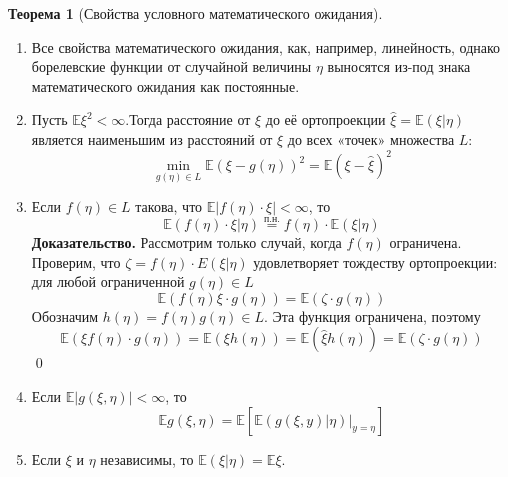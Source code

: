 \documentclass[oneside,final,14pt]{extreport}
\renewenvironment{proof}{{\bfseries Доказательство.}}{\qed}
\theoremstyle{plain}
\theoremstyle{definition}
\theoremstyle{named}
\newtheorem*{namedthm}{Теорема}
\begin{document}
\begin{namedthm}[Свойства условного математического ожидания]\leavevmode
    \begin{enumerate}
        \item Все свойства математического ожидания, как, например, линейность, однако борелевские функции от случайной величины $\eta$ выносятся из-под знака математического ожидания как постоянные.
        \item Пусть $\mathbb{E} \xi^{2}<\infty$.Тогда расстояние от $\xi$ до её ортопроекции $\widehat{\xi}=\mathbb{E}(\xi | \eta)$ является наименьшим из расстояний от $\xi$ до всех «точек» множества $L$:
        \begin{equation*}
            \min_{g(\eta) \in L} \mathbb{E}(\xi-g(\eta))^{2}=\mathbb{E}(\xi-\widehat{\xi})^{2}
        \end{equation*}
        \item Если $f(\eta) \in L$ такова, что $\mathbb{E}|f(\eta) \cdot \xi|<\infty$, то
        \begin{equation*}
            \mathbb{E}(f(\eta) \cdot \xi | \eta)
            \stackrel{\text{п.н.}}{=}
            f(\eta) \cdot \mathbb{E}(\xi | \eta)
        \end{equation*}
        \begin{proof}
            Рассмотрим только случай, когда $f(\eta)$ ограничена. Проверим, что $\zeta=f(\eta) \cdot E(\xi | \eta)$ удовлетворяет тождеству ортопроекции: для любой ограниченной $g(\eta) \in L$
            \begin{equation*}
                \mathbb{E}(f(\eta) \xi \cdot g(\eta))=\mathbb{E}(\zeta \cdot g(\eta))
            \end{equation*}
            Обозначим $h(\eta)=f(\eta) g(\eta) \in L$. Эта функция ограничена, поэтому
            \begin{equation*}
                \mathbb{E}(\xi f(\eta) \cdot g(\eta))=\mathbb{E}(\xi h(\eta))=\mathbb{E}(\widehat{\xi} h(\eta))=\mathbb{E}(\zeta \cdot g(\eta))
            \end{equation*}
        \end{proof}
        \item Если $\mathbb{E}|g(\xi, \eta)|<\infty$, то
        \begin{equation*}
            \mathbb{E} g(\xi, \eta)=\mathbb{E}\left[\left.\mathbb{E}(g(\xi, y) | \eta)\right|_{y=\eta}\right]
        \end{equation*}
        \item Если $\xi$ и $\eta$ независимы, то $\mathbb{E}(\xi | \eta)=\mathbb{E} \xi$.
    \end{enumerate}
\end{namedthm}
\end{document}

